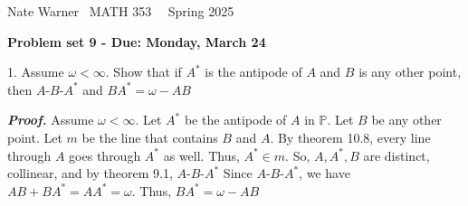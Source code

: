\documentclass{report}
\title{\Huge{}}
\author{\huge{Nathan Warner}}
\date{\huge{}}
\begin{document}
    \pagebreak \bigbreak \noindent
    Nate Warner \ \quad \quad \quad \quad \quad \quad \quad \quad \quad \quad \quad \quad  MATH 353 \quad  \quad \quad \quad \quad \quad \quad \quad \quad \ \ \quad \quad Spring 2025
    \begin{center}
        \textbf{Problem set 9 - Due: Monday, March 24}
    \end{center}
    \bigbreak \noindent 
    \begin{mdframed}
        1. Assume $\omega < \infty $. Show that if $A^{*} $ is the antipode of $A$ and $B$ is any other point, then $ A\text{-}B\text{-}A^{*} $ and $BA^{*} = \omega - AB $
    \end{mdframed}
    \bigbreak \noindent 
    \textbf{\textit{Proof.}} Assume $\omega < \infty$. Let $A^{*}$ be the antipode of $A$ in $\mathbb{P}$. Let $B$ be any other point.
    \bigbreak \noindent 
    Let $m$ be the line that contains $B$ and $A$. By theorem 10.8, every line through $A$ goes through $A^{*}$ as well. Thus, $A^{*}\in m$. So, $A,A^{*}, B$ are distinct, collinear, and by theorem 9.1, $A\text{-}B\text{-}A^{*}$
    \bigbreak \noindent 
    Since $ A\text{-}B\text{-}A^{*}$, we have $AB + BA^{*} = AA^{*} = \omega$. Thus, $ BA^{*} = \omega - AB$ \endpf
\end{document}
